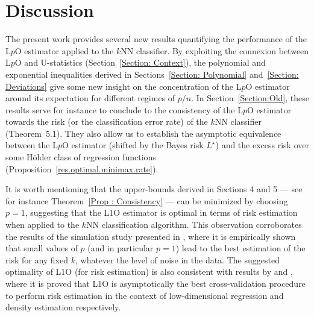 \documentclass[twoside,11pt]{article}
\numberwithin{equation}{section}
\newcommand{\1}{\mathds{1}}%
\numberwithin{equation}{section}
\theoremstyle{plain}
\begin{document}






\section{Discussion} \label{Section: Discussion}

The present work provides several new results quantifying the performance of the L$p$O estimator applied to the $k$NN classifier.
%
By exploiting the connexion between L$p$O and U-statistics (Section~\ref{Section: Context}), the polynomial and exponential inequalities derived in Sections~\ref{Section: Polynomial} and~\ref{Section: Deviations} give some new insight on the concentration of the L$p$O estimator around its expectation for different regimes of $p/n$.
%
In Section~\ref{Section:Old}, these results serve for instance to conclude to the consistency of the L$p$O estimator towards the risk (or the classification error rate) of the $k$NN classifier (Theorem~5.1). They also allow us to establish the asymptotic equivalence between the L$p$O estimator (shifted by the Bayes risk $L^\star$) and the excess risk over some H\"older class of regression functions (Proposition~\ref{res.optimal.minimax.rate}).

\medskip

It is worth mentioning that the upper-bounds derived in Sections 4 and 5 --- see for instance Theorem~\ref{Prop : Consistency} --- can be minimized by choosing $p=1$, suggesting that the L1O estimator is optimal in terms of risk estimation when applied to the $k$NN classification algorithm.
%
This observation corroborates the results of the simulation study presented in \citet{CelisseMaryHuard11}, where it is empirically shown that small values of $p$ (and in particular $p=1$) lead to the best estimation of the risk for any fixed $k$, whatever the level of noise in the data.
%
The suggested optimality of L1O (for risk estimation) is also consistent with results by \citet{Burm89} and \citet{Celi_2014}, where it is proved that L1O is asymptotically the best cross-validation procedure to perform risk estimation in the context of low-dimensional regression and density estimation respectively.
%
\end{document}
